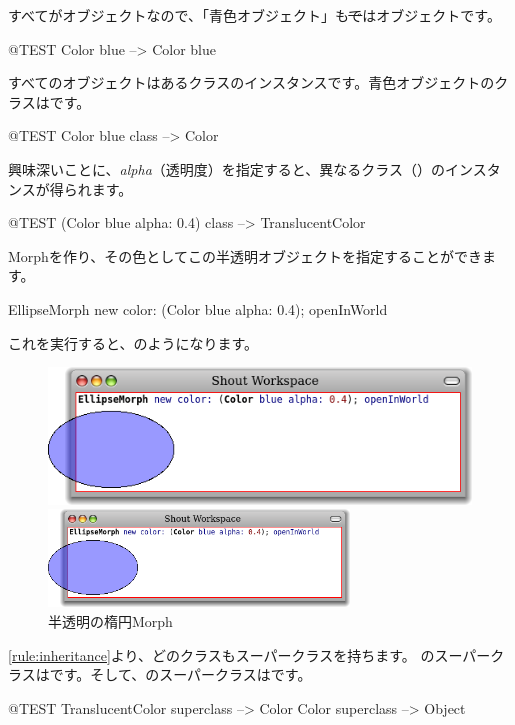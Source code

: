 \documentclass[a4paper,10pt,twoside]{book}
\begin{document}
すべてがオブジェクトなので、「青色オブジェクト」も\st ではオブジェクトです。
\begin{code}{@TEST}
Color blue --> Color blue
\end{code}

\noindent
すべてのオブジェクトはあるクラスのインスタンスです。青色オブジェクトのクラスはです。
\begin{code}{@TEST}
Color blue class --> Color
\end{code}

\noindent
興味深いことに、\emph{alpha}（透明度）を指定すると、異なるクラス（）のインスタンスが得られます。
\begin{code}{@TEST}
(Color blue alpha: 0.4) class --> TranslucentColor
\end{code}

\noindent
Morphを作り、その色としてこの半透明オブジェクトを指定することができます。
\begin{code}{}
EllipseMorph new color: (Color blue alpha: 0.4); openInWorld
\end{code}
\noindent
これを実行すると、のようになります。

\begin{center}
\begin{figure}[!ht]
\ifluluelse
	{\centerline {\includegraphics[scale=0.7]{TranslucentEllipse}}}
	{\centerline {\includegraphics[width=8cm]{TranslucentEllipse}}}
\caption{半透明の楕円Morph}
\end{figure}
\end{center}

\ref{rule:inheritance}より、どのクラスもスーパークラスを持ちます。
のスーパークラスはです。そして、のスーパークラスはです。
\begin{code}{@TEST}
TranslucentColor superclass --> Color
Color superclass                   --> Object
\end{code}
\end{document}
